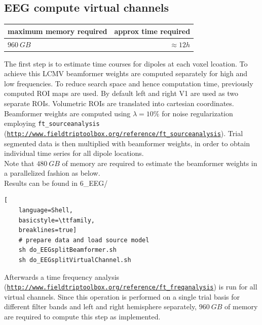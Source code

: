 \documentclass[12pt,a4paper]{scrartcl}
\begin{document}
\subsection{EEG compute virtual channels}

\begin{table}[h]
\begin{tabular}{l | r}
\toprule
maximum memory required & approx time required\\\toprule
$960~GB$ & $\approx 12h$ \\\bottomrule
\end{tabular}
\end{table}
The first step is to estimate time courses for dipoles at each voxel lcoation. To achieve this LCMV beamformer weights are computed separately for high and low frequencies. To reduce search space and hence computation time, previously computed ROI maps are used. By default left and right V1 are used as two separate ROIs. Volumetric ROIs are translated into cartesian coordinates. Beamformer weights are computed using \texttt{$\lambda=10\%$} for noise regularization employing \texttt{ft\_sourceanalysis} (\href{http://www.fieldtriptoolbox.org/reference/ft\_sourceanalysis}{\nolinkurl{http://www.fieldtriptoolbox.org/reference/ft\_sourceanalysis}}). Trial segmented data is then multiplied with beamformer weights, in order to obtain individual time series for all dipole locations.\\
Note that $480~GB$ of memory are required to estimate the beamformer weights in a parallelized fashion as below.\\

\noindent Results can be found in 6\_EEG/\\
\begin{lstlisting}[
    language=Shell,
    basicstyle=\ttfamily,
    breaklines=true]
    # prepare data and load source model
    sh do_EEGsplitBeamformer.sh
    sh do_EEGsplitVirtualChannel.sh
\end{lstlisting}
Afterwards a time frequency analysis (\href{http://www.fieldtriptoolbox.org/reference/ft\_freqanalysis}{\nolinkurl{http://www.fieldtriptoolbox.org/reference/ft\_freqanalysis}}) is run for all virtual channels. Since this operation is performed on a single trial basis for different filter bands and left and right hemisphere separately, $960~GB$ of memory are required to compute this step as implemented.\\
\end{document}

